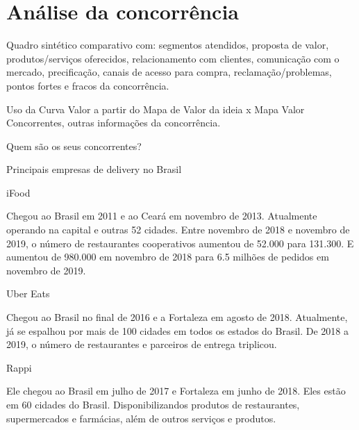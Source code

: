 \section{\textbf{Análise da concorrência}}
\label{sec: Análise da concorrência}

\begin{commentA}
Quadro sintético comparativo com: segmentos atendidos, proposta de valor, produtos/serviços oferecidos, relacionamento com clientes, comunicação com o mercado, precificação, canais de acesso para compra, reclamação/problemas, pontos fortes e fracos da concorrência.
\par \end{commentA}



\begin{commentA}
Uso da Curva Valor a partir do Mapa de Valor da ideia x Mapa Valor Concorrentes, outras informações da concorrência.
\par \end{commentA}



\begin{commentA}
Quem são os seus concorrentes?
\par \end{commentA}

Principais empresas de delivery no Brasil\par
\vspace{0.15cm}
iFood\par

Chegou ao Brasil em 2011 e ao Ceará em novembro de 2013. Atualmente operando na capital e outras 52 cidades. Entre novembro de 2018 e novembro de 2019, o número de restaurantes cooperativos aumentou de 52.000 para 131.300. E aumentou de 980.000 em novembro de 2018 para 6.5 milhões de pedidos em novembro de 2019.\par
\vspace{0.15cm}

Uber Eats\par
Chegou ao Brasil no final de 2016 e a Fortaleza em agosto de 2018. Atualmente, já se espalhou por mais de 100 cidades em todos os estados do Brasil. De 2018 a 2019, o número de restaurantes e parceiros de entrega triplicou.\par
\vspace{0.15cm}

Rappi\par
Ele chegou ao Brasil em julho de 2017 e Fortaleza em junho de 2018. Eles estão em 60 cidades do Brasil. Disponibilizandos produtos de restaurantes, supermercados e farmácias, além de outros serviços e produtos.\par
\vspace{0.15cm}

